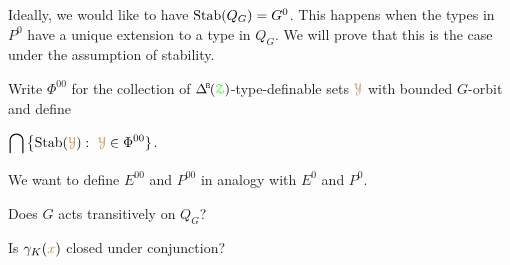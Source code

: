 
Ideally, we would like to have ${\rm Stab}(Q_G)=G^0$.
This happens when the types in $P^0$ have a unique extension to a type in $Q_G$.
We will prove that this is the case under the assumption of stability.


\begin{definition}\label{def_G00}
  Write \emph{$\Phi^{00}$\/} for the collection of $\BDelta(\grZ)$-type-definable sets ${\color{brown}\EuScript Y}$ with bounded $G$-orbit and define\smallskip

  \medrel{=}$\displaystyle\bigcap\big\{{\rm Stab}({\color{brown}\EuScript Y}) :\  {\color{brown}\EuScript Y}\in\Phi^{00}\}$.
\end{definition}

We want to define $E^{00}$ and $P^{00}$ in analogy with $E^0$ and $P^0$.

\begin{question}
  Does $G$ acts transitively on $Q_G$?
\end{question}

\begin{question}
  Is $\gamma_K({\color{brown} x})$ closed under conjunction?
\end{question}












